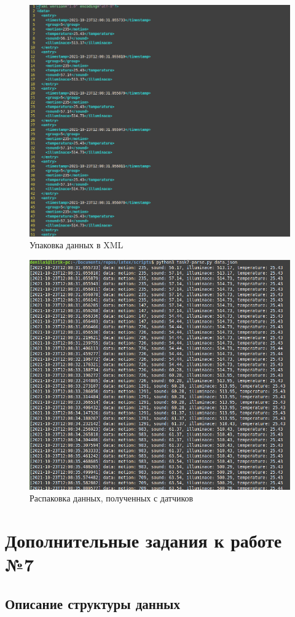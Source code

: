 \documentclass[a4paper,14pt]{extarticle}
\begin{document}
\newpage
\begin{figure}[htpb]
	\centering
	\includegraphics[width=0.7\linewidth]{images/data.xml-cat}
	\caption{Упаковка данных в XML}
	\label{fig:data}
\end{figure}

\begin{figure}[h!]
	\centering
	\includegraphics[width=0.7\linewidth]{images/run-reparse}
	\caption{Распаковка данных, полученных с датчиков}
	\label{fig:run-reparse}
\end{figure}

\section{Дополнительные задания к работе №7}
\setcounter{problem}{0}
\subsection{Описание структуры данных}
\end{document}
